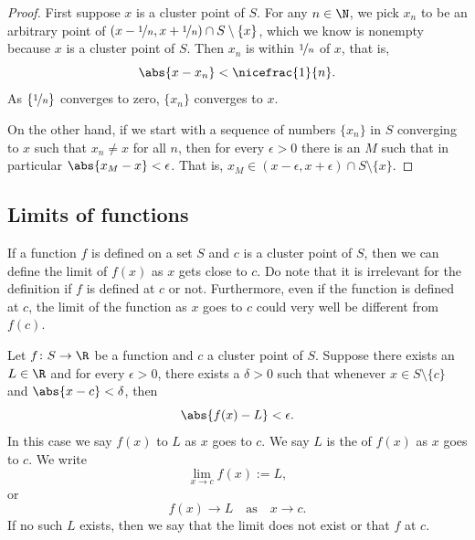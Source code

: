 \documentclass[12pt]{book}
\begin{document}
\begin{proof}
First suppose $x$ is a cluster point of $S$.
For any $n \in \N$, we pick $x_n$ to be an arbitrary point of
$(x-\nicefrac{1}{n},x+\nicefrac{1}{n}) \cap S \setminus \{x\}$, which
we know is nonempty because $x$ is a cluster point of $S$.
Then
$x_n$ is within $\nicefrac{1}{n}$ of $x$, that is,
\begin{equation*}
\abs{x-x_n} < \nicefrac{1}{n} .
\end{equation*}
As $\{ \nicefrac{1}{n} \}$ converges to zero, $\{ x_n \}$ converges to $x$.

On the other hand, if we start with a sequence of numbers $\{ x_n \}$ in $S$
converging to $x$ such that $x_n \not= x$ for all $n$, then for every
$\epsilon > 0$ there is an $M$ such that in particular $\abs{x_M - x} <
\epsilon$.
That is, $x_M \in (x-\epsilon,x+\epsilon) \cap S \setminus \{x\}$.
\end{proof}

\subsection*{Limits of functions}

If a function $f$ is defined on a set $S$ and $c$ is a cluster point of $S$,
then we can define the limit of $f(x)$ as $x$ gets close to $c$.
Do note
that it is irrelevant for the definition if $f$ is defined at $c$ or not.
Furthermore, even if the function is defined at $c$, the limit of the
function as $x$ goes to $c$ could very well be different
from $f(c)$.

\begin{defn}
%
Let $f \colon S \to \R$ be a function and $c$ a cluster point of $S$.
Suppose there exists an $L \in \R$ and for every $\epsilon > 0$,
there exists a $\delta > 0$ such that whenever $x \in S \setminus \{ c \}$
and $\abs{x - c} < \delta$, then
\begin{equation*}
\abs{f(x) - L} < \epsilon .
\end{equation*}
In this case we say $f(x)$ \emph{} to $L$ as $x$ goes
to $c$.
We say $L$ is the \emph{} of $f(x)$ as $x$
goes to $c$.
We write
\begin{equation*}
\lim_{x \to c} f(x) := L ,
\end{equation*}
or 
\begin{equation*}
f(x) \to L \quad\text{as}\quad x \to c .
\end{equation*}
If no such $L$ exists, then we say that the limit does not exist or
that $f$ \emph{} at $c$.
\end{defn}
\end{document}
